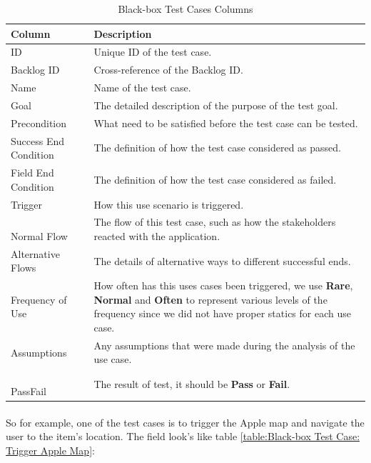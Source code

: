 \documentclass[12pt,a4paper]{article}
\begin{document}
          \begin{table}[H]
            \centering
              \begin{tabularx}{\textwidth}{l X}
                \hline
                Column & Description  \\ \hline
                ID & Unique ID of the test case. \\ 
                Backlog ID & Cross-reference of the Backlog ID. \\ 
                Name & Name of the test case.  \\ 
                Goal & The detailed description of the purpose of the test goal. \\ 
                Precondition & What need to be satisfied before the test case can be tested.\\
                Success End Condition & The definition of how the test case considered as passed. \\
                Field End Condition & The definition of how the test case considered as failed. \\
                Trigger & How this use scenario is triggered.\\
                Normal Flow & The flow of this test case, such as how the stakeholders reacted with the application.\\
                Alternative Flows & The details of alternative ways to different successful ends.\\
                Frequency of Use & How often has this uses cases been triggered, we use {\bf Rare}, {\bf Normal} and {\bf Often} to represent various levels of the frequency since we did not have proper statics for each use case.\\
                Assumptions & Any assumptions that were made during the analysis of the use case. \\
                Pass\/Fail & The result of test, it should be {\bf Pass} or {\bf Fail}. \\
                \hline
              \end{tabularx}
              \caption[Table caption text]{Black-box Test Cases Columns}
              \label{table:Black-box Test Cases Columns}
          \end{table}

          \paragraph{} So for example, one of the test cases is to trigger the Apple map and navigate the user to the item's location. The field look's like table \ref{table:Black-box Test Case: Trigger Apple Map}:
\end{document}

